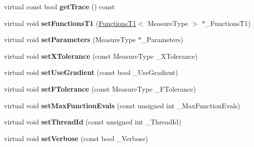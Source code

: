 \begin{DoxyCompactItemize}
\item 
\hypertarget{class_ox_1_1_fitter_a9c3401372be5c8698464deb05c0f5533}{virtual const bool {\bfseries get\-Trace} () const }\label{class_ox_1_1_fitter_a9c3401372be5c8698464deb05c0f5533}

\item 
\hypertarget{class_ox_1_1_fitter_acf5be118a916c6b52034191f1bdaf790}{virtual void {\bfseries set\-Functions\-T1} (\hyperlink{class_ox_1_1_functions_t1}{Functions\-T1}$<$ Measure\-Type $>$ $\ast$\-\_\-\-Functions\-T1)}\label{class_ox_1_1_fitter_acf5be118a916c6b52034191f1bdaf790}

\item 
\hypertarget{class_ox_1_1_fitter_ab97f65c7d4d4db9bb0f5934aa0601b73}{virtual void {\bfseries set\-Parameters} (Measure\-Type $\ast$\-\_\-\-Parameters)}\label{class_ox_1_1_fitter_ab97f65c7d4d4db9bb0f5934aa0601b73}

\item 
\hypertarget{class_ox_1_1_fitter_ad2b680ee88b12dd51538a2da865b2589}{virtual void {\bfseries set\-X\-Tolerance} (const Measure\-Type \-\_\-\-X\-Tolerance)}\label{class_ox_1_1_fitter_ad2b680ee88b12dd51538a2da865b2589}

\item 
\hypertarget{class_ox_1_1_fitter_a2441247888adc90a26d779043f10c5e1}{virtual void {\bfseries set\-Use\-Gradient} (const bool \-\_\-\-Use\-Gradient)}\label{class_ox_1_1_fitter_a2441247888adc90a26d779043f10c5e1}

\item 
\hypertarget{class_ox_1_1_fitter_aca7109a663e737c46cb29483c2276f4a}{virtual void {\bfseries set\-F\-Tolerance} (const Measure\-Type \-\_\-\-F\-Tolerance)}\label{class_ox_1_1_fitter_aca7109a663e737c46cb29483c2276f4a}

\item 
\hypertarget{class_ox_1_1_fitter_a293d2876b8b053bd637c35c3f6f3f68e}{virtual void {\bfseries set\-Max\-Function\-Evals} (const unsigned int \-\_\-\-Max\-Function\-Evals)}\label{class_ox_1_1_fitter_a293d2876b8b053bd637c35c3f6f3f68e}

\item 
\hypertarget{class_ox_1_1_fitter_aa1fc4674aa6a3e6c8567c86ec1fa90e0}{virtual void {\bfseries set\-Thread\-Id} (const unsigned int \-\_\-\-Thread\-Id)}\label{class_ox_1_1_fitter_aa1fc4674aa6a3e6c8567c86ec1fa90e0}

\item 
\hypertarget{class_ox_1_1_fitter_a696da03b83fe3083f29ae4c0e2ecfc44}{virtual void {\bfseries set\-Verbose} (const bool \-\_\-\-Verbose)}\label{class_ox_1_1_fitter_a696da03b83fe3083f29ae4c0e2ecfc44}


\end{DoxyCompactItemize}
